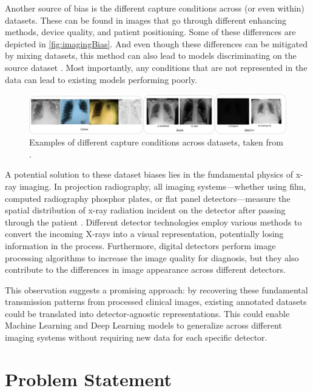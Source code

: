 \documentclass[nomenclature, english, bibtex]{kththesis}
\numberwithin{listing}{chapter}
\begin{document}
Another source of bias is the different capture conditions across (or even within) datasets. These can be found
in images that go through different enhancing methods, device quality, and patient positioning. Some of these
differences are depicted in \autoref{fig:imagingBias}. And even though these differences can be mitigated by
mixing datasets, this method can also lead to models discriminating on the source dataset \cite{arias-garzonBiasesAssociatedDatabase2023}.
Most importantly, any conditions that are not represented in the data can lead to existing models performing poorly.

\begin{figure}
    \centering
    \includegraphics[width=\textwidth]{figures/imaging_bias.jpeg}
    \caption{Examples of different capture conditions across datasets, taken from \cite[Figure~6]{arias-garzonBiasesAssociatedDatabase2023}.}
    \label{fig:imagingBias}
\end{figure}

A potential solution to these dataset biases lies in the fundamental physics of x-ray imaging.
In projection radiography, all imaging systems—whether using film, computed radiography phosphor plates, or flat panel
detectors—measure the spatial distribution of x-ray radiation incident on the detector after passing through
the patient \cite{Seibert3}. Different detector technologies employ various methods to convert the incoming X-rays
into a visual representation, potentially losing information in the process. Furthermore, digital
detectors perform image processing algorithms to increase the image quality for diagnosis, but they also contribute to the
differences in image appearance across different detectors.

This observation suggests a promising approach: by recovering these fundamental transmission patterns from
processed clinical images, existing annotated datasets could be translated into detector-agnostic representations.
This could enable Machine Learning and Deep Learning models to generalize across different imaging systems without
requiring new data for each specific detector.

\section{Problem Statement}
\end{document}
